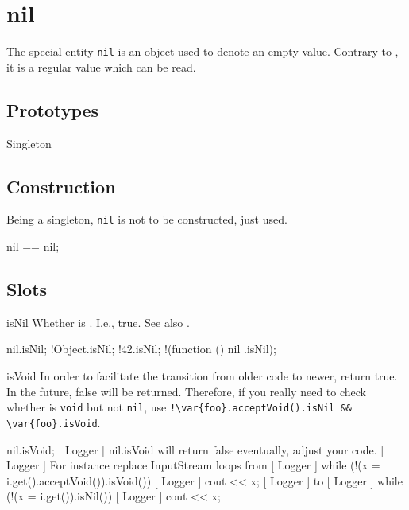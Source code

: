 
\section{nil}

The special entity \lstinline|nil| is an object used to denote an empty
value.  Contrary to , it is a regular value which can be
read.

\subsection{Prototypes}

\begin{refObjects}
\item[Singleton]
\end{refObjects}

\subsection{Construction}

Being a singleton, \lstinline|nil| is not to be constructed, just used.

\begin{urbiassert}[firstnumber=1]
nil == nil;
\end{urbiassert}

\subsection{Slots}

\begin{urbiscriptapi}
\item[isNil] Whether \this is .  I.e., true.  See also
  .
\begin{urbiassert}
nil.isNil;
!Object.isNil;  !42.isNil;  !(function () { nil }.isNil);
\end{urbiassert}


\item[isVoid] In order to facilitate the transition from older code to
  newer, return true.  In the future, false will be returned.  Therefore, if
  you really need to check whether  is \lstinline|void| but not
  \lstinline|nil|, use
  \lstinline|!\var{foo}.acceptVoid().isNil && \var{foo}.isVoid|.
\begin{urbiassert}
nil.isVoid;
[     Logger     ] nil.isVoid will return false eventually, adjust your code.
[     Logger     ]     For instance replace InputStream loops from
[     Logger     ]       while (!(x = i.get().acceptVoid()).isVoid())
[     Logger     ]         cout << x;
[     Logger     ]     to
[     Logger     ]       while (!(x = i.get()).isNil())
[     Logger     ]         cout << x;
\end{urbiassert}
\end{urbiscriptapi}

